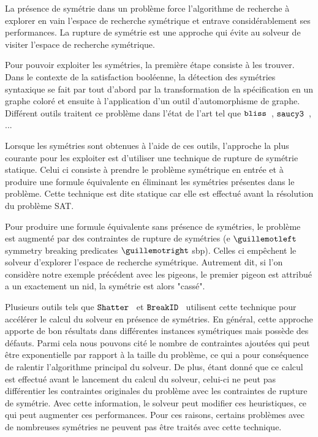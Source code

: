 La présence de symétrie dans un problème force l'algorithme de recherche à explorer en vain l'espace de recherche symétrique et entrave considérablement ses performances. La rupture de symétrie est une approche qui évite au solveur de visiter l'espace de recherche symétrique.

Pour pouvoir exploiter les symétries, la première étape consiste à les trouver. Dans le contexte de la satisfaction booléenne, la détection des symétries syntaxique se fait par tout d'abord par la transformation de la spécification en un graphe coloré et ensuite à l'application d'un outil d'automorphisme de graphe.
Différent outils traitent ce problème dans l'état de l'art tel que $\texttt{bliss}$~\cite{JunttilaKaski:ALENEX2007}, $\texttt{saucy3}$~\cite{katebi2010symmetry}, ...


Lorsque les symétries sont obtenues à l'aide de ces outils, l'approche la plus courante pour les exploiter est d'utiliser une technique de rupture de symétrie statique. Celui ci consiste à prendre le problème symétrique en entrée et à produire une formule équivalente en éliminant les symétries présentes dans le problème.
Cette technique est dite statique car elle est effectué avant la résolution du problème SAT. 

Pour produire une formule équivalente sans présence de symétries, le problème est augmenté par des 
contraintes de rupture de  symétries (e $\guillemotleft$symmetry breaking predicates $\guillemotright$ sbp). Celles ci empêchent le solveur d'explorer l'espace de recherche symétrique. 
Autrement dit, si l'on considère notre exemple précédent avec les pigeons, le premier pigeon est attribué a un
exactement un nid, la symétrie est alors "cassé".

Plusieurs outils tels que $\texttt{Shatter}$~\cite{} et $\texttt{BreakID}$~\cite{} utilisent cette technique pour accélérer le calcul du solveur en présence de symétries.
En général, cette approche apporte de bon résultats dans différentes instances symétriques mais possède des défauts. Parmi cela nous pouvons cité le nombre de contraintes ajoutées qui peut être exponentielle par rapport à la taille du problème, ce qui a pour conséquence de ralentir l'algorithme principal du solveur.
De plus, étant donné que ce calcul est effectué avant le lancement du calcul du solveur, celui-ci ne peut pas différentier les contraintes originales du problème avec les contraintes de rupture de symétrie. Avec cette information, le solveur peut modifier ces heuristiques, ce qui peut augmenter ces performances.
Pour ces raisons, certains problèmes avec de nombreuses symétries ne peuvent pas être traités avec cette technique.

